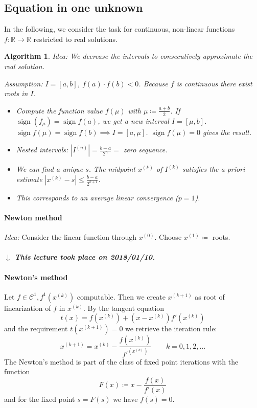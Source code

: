 \documentclass[a4paper]{article}
\numberwithin{lecref}{section}
\theoremstyle{break}
\newtheorem{algorithm}{Algorithm}
\newcommand{\dateref}[1]{%
  \begin{mdframed}[backgroundcolor=gray!10,innerbottommargin=0pt,innertopmargin=0pt]
    \paragraph{\textit{$\downarrow$ This lecture took place on #1.}}%
  \end{mdframed}%
}
\newcommand{\Abs}[1]{\left|#1\right|}
\DeclareMathOperator{\sign}{sign}
\begin{document}
\subsection{Equation in one unknown}
\label{ch:6-2}

In the following, we consider the task for continuous, non-linear functions $f: \mathbb R \to \mathbb R$ restricted to real solutions.

\begin{algorithm}
  \emph{Idea:} We decrease the intervals to consecutively approximate the real solution.

  \emph{Assumption:} $I = [a, b]$, $f(a) \cdot f(b) < 0$. Because $f$ is continuous there exist roots in $I$.

  \begin{itemize}
    \item Compute the function value $f(\mu)$ with $\mu \coloneqq \frac{a + b}{2}$. If $\operatorname{sign}(f_\mu) = \sign{f(a)}$, we get a new interval $I = [\mu, b]$. $\sign{f(\mu)} = \sign{f(b)} \implies I = [a, \mu]$. $\sign{f(\mu)} = 0$ gives the result.
    \item Nested intervals: $\Abs{I^{(n)}} = \frac{b - a}{2^n} = $ zero sequence.
    \item We can find a unique $s$.
      The midpoint $x^{(k)}$ of $I^{(k)}$ satisfies the a-priori estimate $\Abs{x^{(k)} - s} \leq \frac{b - a}{2^{k+1}}$.
    \item This corresponds to an average linear convergence ($p = 1$).
  \end{itemize}
\end{algorithm}

\paragraph{Newton method}

\emph{Idea:} Consider the linear function through $x^{(0)}$. Choose $x^{(1)} \coloneqq$ roots.

\dateref{2018/01/10}

\paragraph{Newton's method}

Let $f \in \mathcal C^1, f^1(x^{(k)})$ computable. Then we create $x^{(k+1)}$ as root of linearization of $f$ in $x^{(k)}$. By the tangent equation
\[ t(x) = f(x^{(k)}) + (x - x^{(k)})f'(x^{(k)}) \]
and the requirement $t(x^{(k+1)}) = 0$ we retrieve the iteration rule:
\[ x^{(k+1)} = x^{(k)} - \frac{f(x^{(k)})}{f'^(x^{(k)})} \qquad k = 0, 1, 2, \dots \]
The Newton's method is part of the class of fixed point iterations with the function
\[ F(x) \coloneqq x - \frac{f(x)}{f'(x)} \]
and for the fixed point $s = F(s)$ we have $f(s) = 0$.
\end{document}
